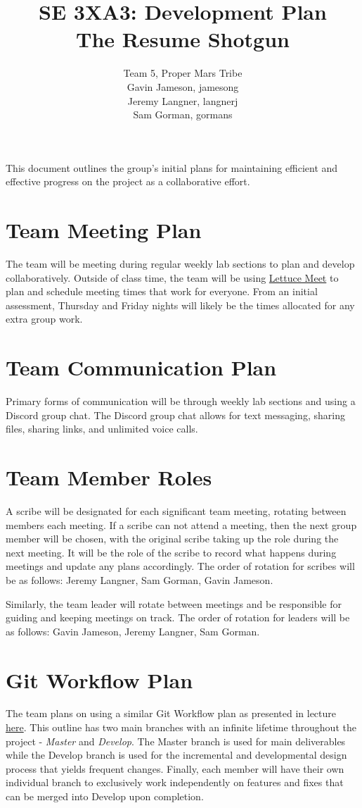 \documentclass{article}
\title{SE 3XA3: Development Plan\\The Resume Shotgun}
\author{Team 5, Proper Mars Tribe
		\\ Gavin Jameson, jamesong
		\\ Jeremy Langner, langnerj
		\\ Sam Gorman, gormans
}
\date{}
\begin{document}
\maketitle

\newpage

\tableofcontents

\newpage

This document outlines the group's initial plans for maintaining efficient and effective progress on the project as a collaborative effort.

\section{Team Meeting Plan}
The team will be meeting during regular weekly lab sections to plan and develop collaboratively. Outside of class time, the team will be using \href{https://lettucemeet.com/}{Lettuce Meet} to plan and schedule meeting times that work for everyone. From an initial assessment, Thursday and Friday nights will likely be the times allocated for any extra group work.

\section{Team Communication Plan}
Primary forms of communication will be through weekly lab sections and using a Discord group chat. The Discord group chat allows for text messaging, sharing files, sharing links, and unlimited voice calls.

\section{Team Member Roles}
A scribe will be designated for each significant team meeting, rotating between members each meeting. If a scribe can not attend a meeting, then the next group member will be chosen, with the original scribe taking up the role during the next meeting. It will be the role of the scribe to record what happens during meetings and update any plans accordingly. The order of rotation for scribes will be as follows: Jeremy Langner, Sam Gorman, Gavin Jameson.

Similarly, the team leader will rotate between meetings and be responsible for guiding and keeping meetings on track. The order of rotation for leaders will be as follows: Gavin Jameson, Jeremy Langner, Sam Gorman.

\section{Git Workflow Plan} \label{sec:gitflow}
The team plans on using a similar Git Workflow plan as presented in lecture  \href{https://nvie.com/posts/a-successful-git-branching-model/}{here}. This outline has two main branches with an infinite lifetime throughout the project - \textit{Master} and \textit{Develop}. The Master branch is used for main deliverables while the Develop branch is used for the incremental and developmental design process that yields frequent changes. Finally, each member will have their own individual branch to exclusively work independently on features and fixes that can be merged into Develop upon completion.
\end{document}
